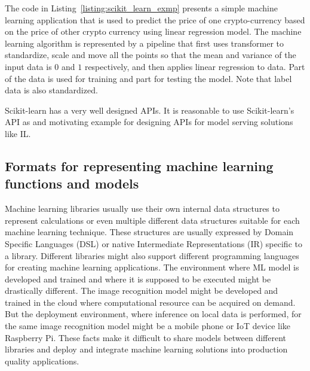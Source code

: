 \documentclass[english, 12pt, a4paper, elec, utf8, online]{aaltothesis}
\begin{document}
The code in Listing~\ref{listing:scikit_learn_exmp} presents a simple machine learning application that is used to predict the price of one crypto-currency based on the price of other crypto currency using linear regression model. The machine learning algorithm is represented by a pipeline that first uses transformer to standardize, scale and move all the points so that the mean and variance of the input data is $0$ and $1$ respectively, and then applies linear regression to data. Part of the data is used for training and part for testing the model. Note that label data is also standardized. 



Scikit-learn has a very well designed APIs. It is reasonable to use Scikit-learn's API as and motivating example for designing APIs for model serving solutions like IL. 
    
\subsection{Formats for representing machine learning functions and models} 
Machine learning libraries usually use their own internal data structures to represent calculations or even multiple different data structures suitable for each machine learning technique. These structures are usually expressed by Domain Specific Languages (DSL) or native Intermediate Representations (IR) specific to a library. Different libraries might also support different programming languages for creating machine learning applications. The environment where ML model is developed and trained and where it is supposed to be executed might be drastically different. The image recognition model might be developed and trained in the cloud where computational resource can be acquired on demand. But the deployment environment, where inference on local data is performed, for the same image recognition model might be a mobile phone or IoT device like Raspberry Pi. These facts make it difficult to share models between different libraries and deploy and integrate machine learning solutions into production quality applications. 
\end{document}
